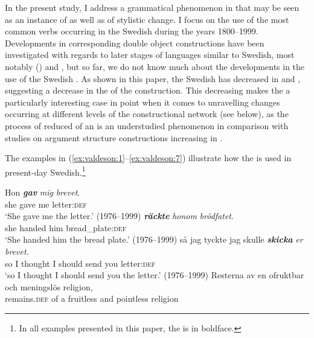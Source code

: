 \documentclass[output=paper]{langscibook}
\begin{document}
In the present study, I address a grammatical phenomenon in  that may be seen as an instance of  as well as of stylistic change. I focus on the use of the most common verbs occurring in the Swedish  during the years 1800–1999. Developments in corresponding double object constructions have been investigated with regards to later stages of languages similar to Swedish, most notably  (\citealt{CollemanDe_Clerck2008,  CollemanDe_Clerck2011, CollemanDe_Clerck2008}) and  \citep{Colleman2011}, but so far, we do not know much about the developments in the use of the Swedish . As shown in this paper, the Swedish  has decreased in  and , suggesting a decrease in the  of the construction. This decreasing  makes the  a particularly interesting case in point when it comes to unravelling changes occurring at different levels of the constructional network (see  below), as the process of reduced  of an  is an understudied phenomenon in comparison with studies on argument structure constructions increasing in .



The examples in (\ref{ex:valdeson:1}--\ref{ex:valdeson:7}) illustrate how the  is used in present-day Swedish.\footnote{In all examples presented in this paper, the  is in boldface.}


\ea \label{ex:valdeson:1}
\gll Hon \textbf{\textit{gav}} \textit{mig}     \textit{brevet}.\\
she    gave     me   letter:\textsc{def}\\
\glt `She gave me the letter.’ (1976--1999)
\ex
{} \textbf{\textit{räckte}} \textit{honom}     \textit{brödfatet}.\\
  she       handed     him       bread\_plate:\textsc{def}  \\
\glt `She handed him the bread plate.’ (1976--1999)
\ex
\gll så     jag   tyckte   jag     skulle \textbf{\textit{skicka}} \textit{er}       \textit{brevet.}\\
  so    I        thought  I      should    send    you    letter:\textsc{def}\\
\glt `so I thought I should send you the letter.’ (1976--1999)
\ex
\gll Resterna av   en ofruktbar     och   meningslös religion,\\
  remains.\textsc{def} of  a  fruitless  and  pointless  religion    \\
\end{document}
